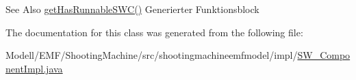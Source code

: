 \begin{DoxySeeAlso}{See Also}
\hyperlink{classshootingmachineemfmodel_1_1impl_1_1_s_w___component_impl_afb6ead0797fbb25059fe4a7a507cfb3e}{get\-Has\-Runnable\-S\-W\-C()} Generierter Funktionsblock  
\end{DoxySeeAlso}


The documentation for this class was generated from the following file\-:\begin{DoxyCompactItemize}
\item 
Modell/\-E\-M\-F/\-Shooting\-Machine/src/shootingmachineemfmodel/impl/\hyperlink{_s_w___component_impl_8java}{S\-W\-\_\-\-Component\-Impl.\-java}\end{DoxyCompactItemize}
